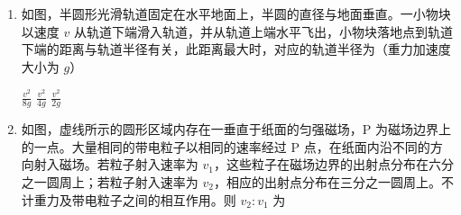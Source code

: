 \documentclass[\gkver]{gaokaozhenti}
\begin{document}
\begin{enumerate}
\onepicture[w=3.06cm]{}

{$\frac{\sqrt{3}}{6}$}
{$\frac{\sqrt{3}}{3}$}
{$\frac{\sqrt{3}}{2}$}


\item
如图，半圆形光滑轨道固定在水平地面上，半圆的直径与地面垂直。一小物块以速度 $v$ 从轨道下端滑入轨道，并从轨道上端水平飞出，小物块落地点到轨道下端的距离与轨道半径有关，此距离最大时，对应的轨道半径为（重力加速度大小为 $g$） 

\onepicture[w=3.13cm]{}

{$\frac{v^2}{8g}$}
{$\frac{v^2}{4g}$}
{$\frac{v^2}{2g}$}


\item
如图，虚线所示的圆形区域内存在一垂直于纸面的匀强磁场，P 为磁场边界上的一点。大量相同的带电粒子以相同的速率经过 P 点，在纸面内沿不同的方向射入磁场。若粒子射入速率为 $v_1$，这些粒子在磁场边界的出射点分布在六分之一圆周上；若粒子射入速率为 $v_2$，相应的出射点分布在三分之一圆周上。不计重力及带电粒子之间的相互作用。则 $v_2:v_1$ 为 


\end{enumerate}
\end{document}
